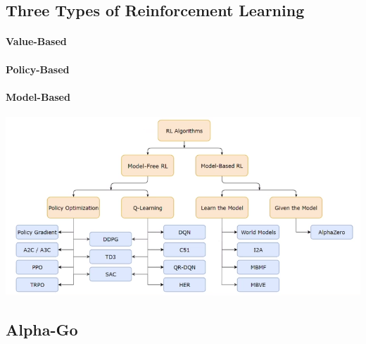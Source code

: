 \documentclass[10pt]{report}
\begin{document}
\subsection{Three Types of Reinforcement Learning} \begin{multicols}{3}
\paragraph{Value-Based} \begin{list}{}{}
	\item %
\end{list}
\paragraph{Policy-Based} \begin{list}{}{}
	\item %
\end{list}
\paragraph{Model-Based} \begin{list}{}{}
	\item %
\end{list}
\end{multicols}
\begin{center}
	\includegraphics[scale=0.5]{190.png}
\end{center}
\subsection{Alpha-Go}
\end{document}
